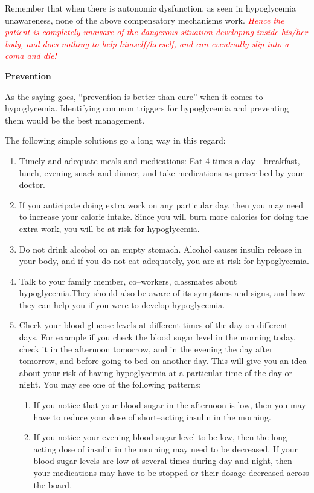 Remember that when there is autonomic dysfunction, as seen in hypoglycemia unawareness, none of the above compensatory mecha\-nisms work. \textcolor{red}{\textit{Hence the patient is completely unaware of the dangerous situation developing inside his/her body, and does nothing to help himself/herself, and can eventually slip into a coma and die!}}


\noindent\textbf{Prevention}

As the saying goes, “prevention is better than cure” when it comes to hypoglycemia. Identifying common triggers for hypoglycemia and preventing them would be the best management.

\noindent The following simple solutions go a long way in this regard:
\begin{enumerate}[•]
\itemsep=0pt
\item Timely and adequate meals and medications: Eat 4 times a day—breakfast, lunch, evening snack and dinner, and take medications as prescribed by your doctor.
 \item If you anticipate doing extra work on any particular day, then you may need to increase your calorie intake. Since you will burn more calories for doing the extra work, you will be at risk for hypoglycemia.
 \item Do not drink alcohol on an empty stomach. Alcohol causes insulin release in your body, and if you do not eat adequately, you are at risk for hypoglycemia.
 \item Talk to your family member, co–workers, classmates about hypoglycemia.They should also be aware of its symptoms and signs, and how they can help you if you were to develop hypoglycemia.
 \item Check your blood glucose levels at different times of the day on diffe\-rent days. For example if you check the blood sugar level in the morning today, check it in the afternoon tomorrow, and in the eve\-ning the day after tomorrow, and before going to bed on another day. This will give you an idea about your risk of having hypoglycemia at a particular time of the day or night. You may see one of the following patterns:
 \begin{enumerate}[o]
\itemsep=0pt
 \item If you notice that your blood sugar in the afternoon is low, then you may have to reduce your dose of short–acting insulin in the morning.
 \item If you notice your evening blood sugar level to be low, then the long–acting dose of insulin in the morning may need to be decreased. If your blood sugar levels are low at several times during day and night, then your medications may have to be stopped or their dosage decreased across the board.
\end{enumerate}
\end{enumerate}

